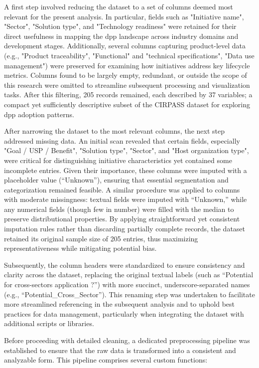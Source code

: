 A first step involved reducing the dataset to a set of columns deemed most relevant for the present analysis. In particular, fields such as "Initiative name", "Sector", "Solution type", and "Technology readiness" were retained for their direct usefulness in mapping the \ac{dpp} landscape across industry domains and development stages. Additionally, several columns capturing product-level data (e.g., "Product traceability", "Functional" and "technical specifications", "Data use management") were preserved for examining how initiatives address key lifecycle metrics. Columns found to be largely empty, redundant, or outside the scope of this research were omitted to streamline subsequent processing and visualization tasks. After this filtering, 205 records remained, each described by 37 variables; a compact yet sufficiently descriptive subset of the CIRPASS dataset for exploring \ac{dpp} adoption patterns.

After narrowing the dataset to the most relevant columns, the next step addressed missing data. An initial scan revealed that certain fields, especially "Goal / USP / Benefit", "Solution type", "Sector", and "Host organization type", were critical for distinguishing initiative characteristics yet contained some incomplete entries. Given their importance, these columns were imputed with a placeholder value (“Unknown”), ensuring that essential segmentation and categorization remained feasible. A similar procedure was applied to columns with moderate missingness: textual fields were imputed with “Unknown,” while any numerical fields (though few in number) were filled with the median to preserve distributional properties. By applying straightforward yet consistent imputation rules rather than discarding partially complete records, the dataset retained its original sample size of 205 entries, thus maximizing representativeness while mitigating potential bias.

Subsequently, the column headers were standardized to ensure consistency and clarity across the dataset, replacing the original textual labels (such as “Potential for cross-sectors application ?”) with more succinct, underscore-separated names (e.g., “Potential\_Cross\_Sector”). This renaming step was undertaken to facilitate more streamlined referencing in the subsequent analysis and to uphold best practices for data management, particularly when integrating the dataset with additional scripts or libraries.

Before proceeding with detailed cleaning, a dedicated preprocessing pipeline was established to ensure that the raw data is transformed into a consistent and analyzable form. This pipeline comprises several custom functions:

